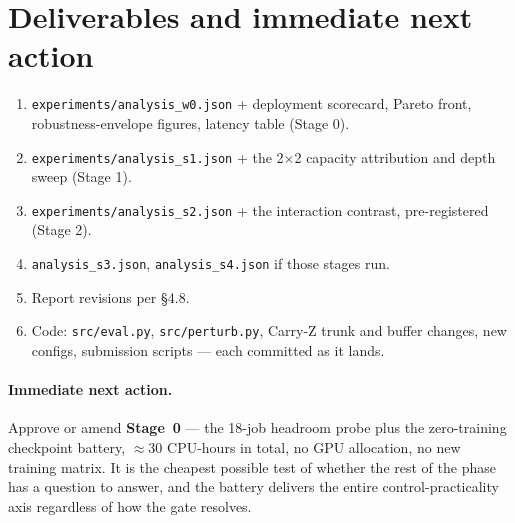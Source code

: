 \documentclass[11pt]{article}
\newcommand{\code}[1]{\texttt{\small #1}}
\begin{document}
\section{Deliverables and immediate next action}

\begin{enumerate}[leftmargin=1.6em,itemsep=1pt]
\item \code{experiments/analysis\_w0.json} + deployment scorecard, Pareto front, robustness-envelope figures, latency table (Stage 0).
\item \code{experiments/analysis\_s1.json} + the 2$\times$2 capacity attribution and depth sweep (Stage 1).
\item \code{experiments/analysis\_s2.json} + the interaction contrast, pre-registered (Stage 2).
\item \code{analysis\_s3.json}, \code{analysis\_s4.json} if those stages run.
\item Report revisions per \S4.8.
\item Code: \code{src/eval.py}, \code{src/perturb.py}, Carry-Z trunk and buffer changes, new configs, submission scripts --- each committed as it lands.
\end{enumerate}

\paragraph{Immediate next action.} Approve or amend \textbf{Stage~0} --- the 18-job headroom probe plus the zero-training checkpoint battery, $\approx$30 CPU-hours in total, no GPU allocation, no new training matrix. It is the cheapest possible test of whether the rest of the phase has a question to answer, and the battery delivers the entire control-practicality axis regardless of how the gate resolves.
\end{document}
